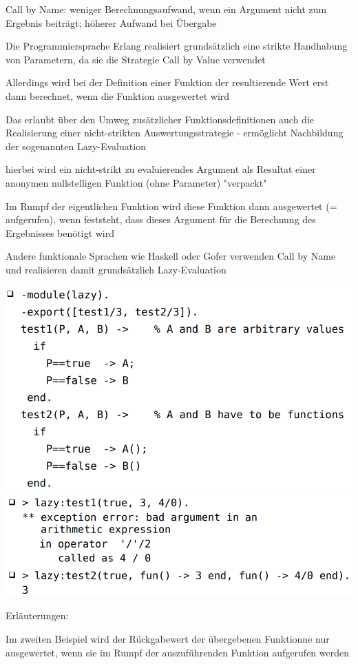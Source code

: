 \documentclass[10pt]{article}
\begin{document}
\begin{itemize*}
\begin{itemize*}
    \item Call by Name: weniger Berechnungsaufwand, wenn ein Argument nicht zum Ergebnis beiträgt; höherer Aufwand bei Übergabe
  \end{itemize*}
  \item Die Programmiersprache Erlang realisiert grundsätzlich eine strikte Handhabung von Parametern, da sie die Strategie Call by Value verwendet
  \item Allerdings wird bei der Definition einer Funktion der resultierende Wert erst dann berechnet, wenn die Funktion ausgewertet wird
  \begin{itemize*}
    \item Das erlaubt über den Umweg zusätzlicher Funktionsdefinitionen auch die Realisierung einer nicht-strikten Auswertungsstrategie - ermöglicht Nachbildung der sogenannten Lazy-Evaluation
    \item hierbei wird ein nicht-strikt zu evaluierendes Argument als Resultat einer anonymen nullstelligen Funktion (ohne Parameter) "verpackt"
    \item Im Rumpf der eigentlichen Funktion wird diese Funktion dann ausgewertet (= aufgerufen), wenn feststeht, dass dieses Argument für die Berechnung des Ergebnisses benötigt wird
    \item Andere funktionale Sprachen wie Haskell oder Gofer verwenden Call by Name und realisieren damit grundsätzlich Lazy-Evaluation
  \end{itemize*}
  \begin{center}
    \includegraphics[width=0.4\linewidth]{Assets/Programmierparadigmen-code-snippet-66}
    \includegraphics[width=0.4\linewidth]{Assets/Programmierparadigmen-code-snippet-67}
  \end{center}
  \item Erläuterungen:
  \begin{itemize*}
    \item Im zweiten Beispiel wird der Rückgabewert der übergebenen Funktionne nur ausgewertet, wenn sie im Rumpf der auszuführenden Funktion aufgerufen werden

\end{itemize*}
\end{itemize*}
\end{document}

